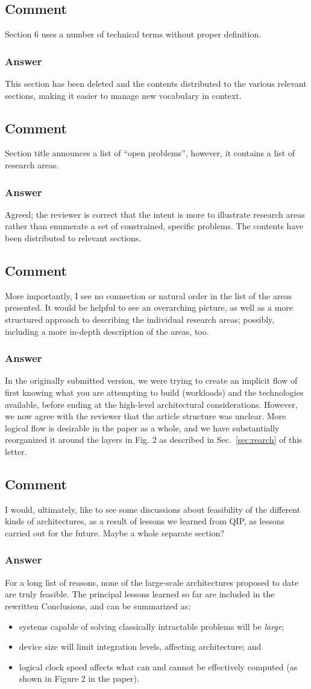 \documentclass{article}
\newcommand{\comment}{\subsection{Comment}\em}
\newcommand{\answer}{\rm \subsubsection*{Answer}}
\begin{document}
\comment

Section 6 uses a number of technical terms without proper definition.

\answer

This section has been deleted and the contents distributed to the
various relevant sections, making it easier to manage new vocabulary
in context.

\comment

Section title announces a list of ``open problems'', however, it
contains a list of research areas.  

\answer

Agreed; the reviewer is correct that the intent is more to illustrate
research areas rather than enumerate a set of constrained, specific
problems.  The contents have been distributed to relevant sections.

\comment

More importantly, I see no connection or natural order in the list of
the areas presented.  It would be helpful to see an overarching
picture, as well as a more structured approach to describing the
individual research areas; possibly, including a more in-depth
description of the areas, too.

\answer

In the originally submitted version, we were trying to create an
implicit flow of first knowing what you are attempting to build
(workloads) and the technologies available, before ending at the
high-level architectural considerations.  However, we now agree with
the reviewer that the article structure was unclear.  More logical
flow is desirable in the paper as a whole, and we have substantially
reorganized it around the layers in Fig. 2 as described in
Sec.~\ref{sec:rearch} of this letter.

\comment

I would, ultimately, like to see some discussions about feasibility of
the different kinds of architectures, as a result of lessons we
learned from QIP, as lessons carried out for the future.  Maybe a
whole separate section?

\answer

For a long list of reasons, none of the large-scale architectures
proposed to date are truly feasible.  The principal lessons learned so
far are included in the rewritten Conclusions, and can be summarized
as:

\begin{itemize}
\item systems capable of solving classically intractable problems will
  be {\em large};
\item device size will limit integration levels, affecting
  architecture; and
\item logical clock speed affects what can and cannot be effectively
  computed (as shown in Figure 2 in the paper).
\end{itemize}
\end{document}
